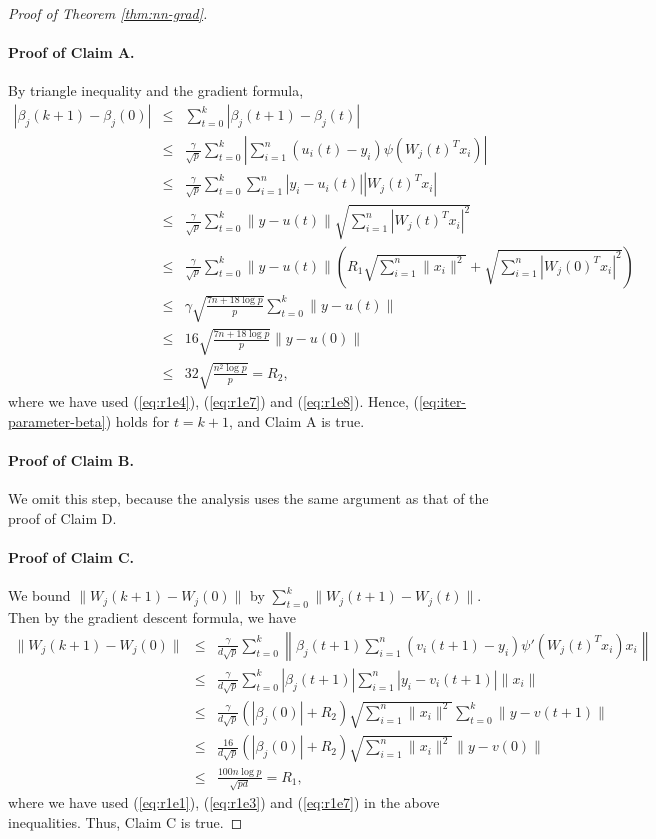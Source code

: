 \begin{proof}[Proof of Theorem \ref{thm:nn-grad}]
\paragraph{Proof of Claim A.}
By triangle inequality and the gradient formula,
\begin{eqnarray*}
|\beta_j(k+1)-\beta_j(0)| &\leq& \sum_{t=0}^k|\beta_j(t+1)-\beta_j(t)| \\
&\leq& \frac{\gamma}{\sqrt{p}}\sum_{t=0}^k\left|\sum_{i=1}^n(u_i(t)-y_i)\psi(W_j(t)^Tx_i)\right| \\
&\leq& \frac{\gamma}{\sqrt{p}}\sum_{t=0}^k\sum_{i=1}^n|y_i-u_i(t)||W_j(t)^Tx_i| \\
&\leq& \frac{\gamma}{\sqrt{p}}\sum_{t=0}^k\|y-u(t)\|\sqrt{\sum_{i=1}^n|W_j(t)^Tx_i|^2} \\
&\leq& \frac{\gamma}{\sqrt{p}}\sum_{t=0}^k\|y-u(t)\|\left(R_1\sqrt{\sum_{i=1}^n\|x_i\|^2}+\sqrt{\sum_{i=1}^n|W_j(0)^Tx_i|^2}\right) \\
&\leq& \gamma\sqrt{\frac{7n+18\log p}{p}}\sum_{t=0}^k\|y-u(t)\| \\
&\leq& 16\sqrt{\frac{7n+18\log p}{p}}\|y-u(0)\| \\
&\leq& 32\sqrt{\frac{n^2\log p}{p}} = R_2,
\end{eqnarray*}
where we have used (\ref{eq:r1e4}), (\ref{eq:r1e7}) and (\ref{eq:r1e8}).
Hence, (\ref{eq:iter-parameter-beta}) holds for $t=k+1$, and Claim A is true.

\paragraph{Proof of Claim B.} We omit this step, because the analysis uses the same argument as that of the proof of Claim D.

\paragraph{Proof of Claim C.} We bound $\|W_j(k+1)-W_j(0)\|$ by $\sum_{t=0}^k\|W_j(t+1)-W_j(t)\|$. Then by the gradient descent formula, we have
\begin{eqnarray*}
\|W_j(k+1)-W_j(0)\| &\leq& \frac{\gamma}{d\sqrt{p}}\sum_{t=0}^k\left\|\beta_j(t+1)\sum_{i=1}^n(v_i(t+1)-y_i)\psi'(W_j(t)^Tx_i)x_i\right\| \\
&\leq& \frac{\gamma}{d\sqrt{p}}\sum_{t=0}^k|\beta_j(t+1)|\sum_{i=1}^n|y_i-v_i(t+1)|\|x_i\| \\
&\leq& \frac{\gamma}{d\sqrt{p}}(|\beta_j(0)|+R_2)\sqrt{\sum_{i=1}^n\|x_i\|^2}\sum_{t=0}^k\|y-v(t+1)\| \\
&\leq& \frac{16}{d\sqrt{p}}(|\beta_j(0)|+R_2)\sqrt{\sum_{i=1}^n\|x_i\|^2}\|y-v(0)\| \\
&\leq& \frac{100n\log p}{\sqrt{pd}} = R_1,
\end{eqnarray*}
where we have used (\ref{eq:r1e1}), (\ref{eq:r1e3}) and (\ref{eq:r1e7}) in the above inequalities. Thus, Claim C is true.


\end{proof}
